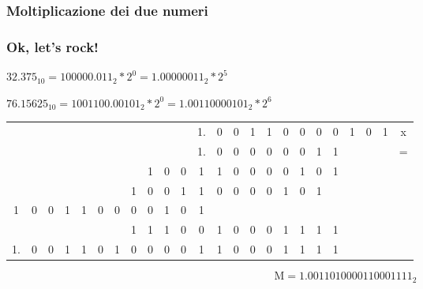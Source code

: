\documentclass{beamer}
\begin{document}
  \subsubsection{Moltiplicazione dei due numeri}
  \begin{frame}
  		\frametitle{Ok, let's rock!}
  	
    $32.375_{10} = 100000.011_{2} * 2^{0} = 1.00000011_{2} * 2^{5}$
    
    $76.15625_{10} = 1001100.00101_{2} * 2^{0} = 1.00110000101_{2} * 2^{6}$
    	
    	\pause
    
    \vspace{1em}
		
		\setlength{\tabcolsep}{2pt}
		\begin{center}
				\begin{tabular}{ccccccccccccccccccccccc|c}
				  &   &   &   &   &   &   &   &   &   &   & 1. & 0 & 0 & 1 & 1 & 0 & 0 & 0 & 0 & 1 & 0 & 1 & x \\ 
			    &   &   &   &   &   &   &   &   &   &   & 1. & 0 & 0 & 0 & 0 & 0 & 0 & 1 & 1 &   &   &   & = \\ 
				\hline 
				  &   &   &   &   &   &   &   & 1 & 0 & 0 & 1 & 1 & 0 & 0 & 0 & 0 & 1 & 0 & 1 &   &   &   &  \\ 
				  &   &   &   &   &   &   & 1 & 0 & 0 & 1 & 1 & 0 & 0 & 0 & 0 & 1 & 0 & 1 &   &   &   &   &  \\ 
				1 & 0 & 0 & 1 & 1 & 0 & 0 & 0 & 0 & 1 & 0 & 1 &   &   &   &   &   &   &   &   &   &   &   &  \\ 
				\hline 
				  &   &   &   &   &   &   & 1 & 1 & 1 & 0 & 0 & 1 & 0 & 0 & 0 & 1 & 1 & 1 & 1 &   &   &   &  \\ 
				\hline 
				1. & 0 & 0 & 1 & 1 & 0 & 1 & 0 & 0 & 0 & 0 & 1 & 1 & 0 & 0 & 0 & 1 & 1 & 1 & 1 &   &   &   &  \\ 
				\end{tabular} 
		\end{center}
		
		\vspace{2em}
    
		$$\text{M} = 1.0011010000110001111_{2}$$
  		
  \end{frame}
\end{document}
